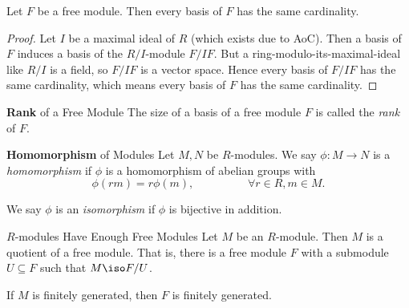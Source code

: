 \documentclass[co439]{subfiles}
\begin{document}
    \rruleline

    \begin{lemma}{}
        Let $F$ be a free module. Then every basis of $F$ has the same cardinality.
    \end{lemma}

    \begin{proof}
        Let $I$ be a maximal ideal of $R$ (which exists due to AoC). Then a basis of $F$ induces a basis of the $R /I$-module $F /IF$. But a ring-modulo-its-maximal-ideal like $R /I$ is a field, so $F /IF$ is a vector space. Hence every basis of $F /IF$ has the same cardinality, which means every basis of $F$ has the same cardinality.
    \end{proof}
    
    \begin{definition}{\textbf{Rank} of a Free Module}
        The size of a basis of a free module $F$ is called the \emph{rank} of $F$.
    \end{definition}
    
    \begin{definition}{\textbf{Homomorphism} of Modules}
        Let $M,N$ be $R$-modules. We say $\phi:M\to N$ is a \emph{homomorphism} if $\phi$ is a homomorphism of abelian groups with
        \begin{equation*}
            \phi\left( rm \right) = r\phi\left( m \right), \hspace{2cm}\forall r\in R, m\in M.
        \end{equation*}

        We say $\phi$ is an \emph{isomorphism} if $\phi$ is bijective in addition.
    \end{definition}
    
    \begin{prop}{$R$-modules Have Enough Free Modules}
        Let $M$ be an $R$-module. Then $M$ is a quotient of a free module. That is, there is a free module $F$ with a submodule $U\subseteq F$ such that $M\iso F /U$.

        If $M$ is finitely generated, then $F$ is finitely generated.
    \end{prop}
    
\end{document}
